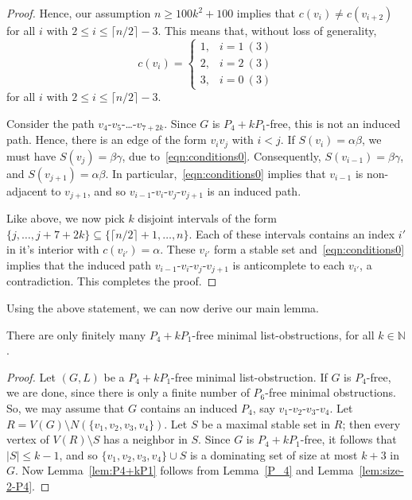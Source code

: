 \documentclass[11pt]{article}
\begin{document}
\begin{proof}
Hence, our assumption $n \ge 100 k^2+100$ implies that $c(v_i)\neq c(v_{i+2})$ for all $i$ with $2 \le i \le \lceil n/2\rceil-3$.
This means that, without loss of generality,
\begin{equation}
c(v_i)=
\begin{cases}
1, & i = 1 ~(3)\\
2, & i = 2 ~(3)\\
3, & i = 0 ~(3)
\end{cases}
\end{equation}
for all $i$ with $2 \le i \le \lceil n/2\rceil-3$.

Consider the path $v_4$-$v_5$-\ldots-$v_{7+2k}$.
Since $G$ is $P_4 + k P_1$-free, this is not an induced path. 
Hence, there is an edge of the form $v_iv_j$ with $i < j$.
If $S(v_i)=\alpha\beta$, we must have $S(v_j)=\beta\gamma$, due to~\eqref{eqn:conditions0}.
Consequently, $S(v_{i-1})=\beta\gamma$, and $S(v_{j+1})=\alpha\beta$.
In particular,~\eqref{eqn:conditions0} implies that $v_{i-1}$ is non-adjacent to $v_{j+1}$, and so $v_{i-1}$-$v_i$-$v_j$-$v_{j+1}$ is an induced path.

Like above, we now pick $k$ disjoint intervals of the form $\{j,\ldots,j+7+2k\} \subseteq \{\lceil n/2\rceil+1,\ldots,n\}$.
Each of these intervals contains an index $i'$ in it's interior with $c(v_{i'})=\alpha$.
These $v_{i'}$ form a stable set and~\eqref{eqn:conditions0} implies that the induced path $v_{i-1}$-$v_i$-$v_j$-$v_{j+1}$ is anticomplete to each $v_{i'}$, a contradiction.
This completes the proof.
\end{proof}

Using the above statement, we can now derive our main lemma.

\begin{lemma}\label{lem:P4+kP1}
There are only finitely many $P_4+k P_1$-free minimal list-obstructions, for all $k \in \mathbb N$.
\end{lemma}
\begin{proof}
Let $(G,L)$ be a $P_4+kP_1$-free minimal list-obstruction.
If $G$ is $P_4$-free, we are done, since there is only a finite number of $P_6$-free minimal obstructions.
So, we may assume that $G$ contains an induced $P_4$, say $v_1$-$v_2$-$v_3$-$v_4$.
Let $R=V(G)\setminus N(\{v_1,v_2,v_3,v_4\})$.
Let $S$ be a maximal stable set in $R$; then every vertex of 
$V(R) \setminus S$ has a neighbor in $S$.  Since $G$ is $P_4+kP_1$-free, it 
follows that   $|S| \leq k-1$, and so $\{v_1, v_2,v_3,v_4\} \cup S$ is a 
dominating set of size at most $k+3$ in $G$. Now Lemma~\ref{lem:P4+kP1} follows from Lemma~\ref{P_4} and Lemma~\ref{lem:size-2-P4}.
\end{proof}
\end{document}
